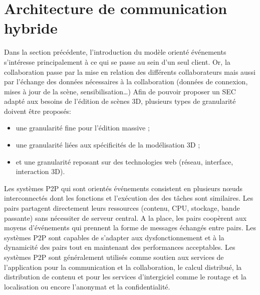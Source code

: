 \section{Architecture de communication hybride}


Dans la section précédente, l'introduction du modèle orienté événements 
s'intéresse principalement à ce qui se passe au sein d'un seul client. 
Or, la collaboration passe par la mise en relation des différents collaborateurs mais aussi par  
l'échange des données nécessaires à la collaboration (données de connexion, 
mises à jour de la scène, sensibilisation\dots)
Afin de pouvoir proposer un \gls{SEC} adapté aux besoins de l'édition de scènes 
3D, plusieurs types de granularité doivent être proposés: 
\begin{itemize}
	\item une granularité fine pour l'édition massive ;
	\item une granularité liées aux spécificités de la modélisation \gls{3D} ;
	\item et une granularité reposant sur des technologies web (réseau, interface, 
	interaction \gls{3D}).
\end{itemize}

Les systèmes \gls{P2P} qui sont orientés événements consistent en plusieurs 
n\oe uds interconnectés dont les fonctions et l'exécution des des tâches sont
similaires. Les pairs partagent directement leurs ressources (contenu, CPU, 
stockage, bande passante) sans nécessiter de serveur central. A la place, les 
pairs coopèrent aux moyens d'événements qui prennent la forme de messages 
échangés entre pairs. Les systèmes \gls{P2P} sont capables de s'adapter aux 
dysfonctionnement et à la dynamicité des pairs tout en maintenant des 
performances acceptables. Les systèmes \gls{P2P} sont généralement utilisés 
comme soutien aux services de l'application pour la communication et la 
collaboration, le calcul distribué, la distribution de contenu et pour les services 
d'intergiciel comme le routage et la localisation ou encore l'anonymat et la confidentialité.

